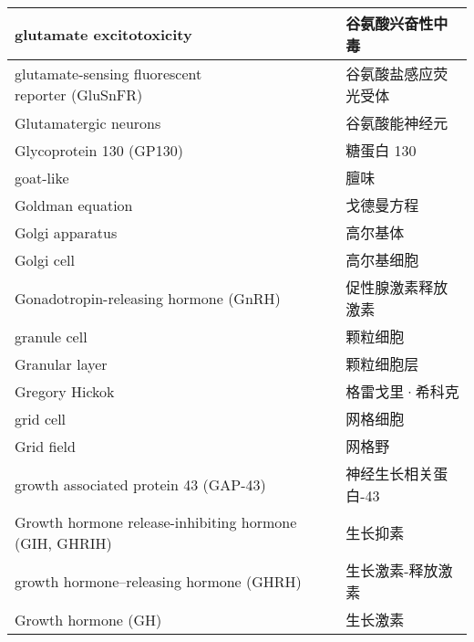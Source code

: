 \begin{longtable}{lll}
	\midrule
	glutamate excitotoxicity     &&  谷氨酸兴奋性中毒  \\
	
	\midrule
	\makecell[l]{glutamate-sensing fluorescent \\ reporter (GluSnFR) }   &&  谷氨酸盐感应荧光受体  \\
	
	\midrule
	Glutamatergic neurons     &&  谷氨酸能神经元  \\
	
	\midrule
	Glycoprotein 130 (GP130)    &&  糖蛋白 130  \\
	
	\midrule
	goat-like     &&  	膻味  \\
	
	\midrule
	Goldman equation     &&  	戈德曼方程  \\
	
	\midrule
	Golgi apparatus     &&  	高尔基体  \\
	
	\midrule
	Golgi cell     &&  	高尔基细胞  \\
	
	\midrule
	Gonadotropin-releasing hormone (GnRH)    &&  	促性腺激素释放激素  \\
	
	\midrule
	granule cell     &&  	颗粒细胞  \\
	
	\midrule
	Granular layer     &&  	颗粒细胞层  \\
	
	\midrule
	Gregory Hickok     &&  	格雷戈里·希科克  \\
	
	\midrule
	grid cell     &&  	网格细胞  \\
	
	\midrule
	Grid field     &&  	网格野  \\
	
	\midrule
	growth associated protein 43  (GAP-43)   &&  神经生长相关蛋白-43  \\
	
	\midrule
	Growth hormone release-inhibiting hormone (GIH, GHRIH)  &&  生长抑素  \\
	
	\midrule
	growth hormone–releasing hormone (GHRH)  &&  生长激素-释放激素  \\
	
	\midrule
	Growth hormone (GH)  &&  生长激素  \\
	

\end{longtable}
